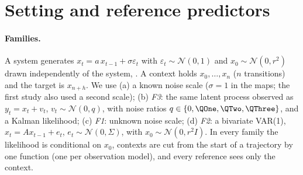 \section{Setting and reference predictors}
\paragraph{Families.} A system generates $x_t = a\,x_{t-1} + \sigma\varepsilon_t$ with $\varepsilon_t\sim\mathcal N(0,1)$ and
$x_0\sim\mathcal N(0,r^2)$ drawn independently of the system, \rlist. A context holds $x_0,\dots,x_n$ ($n$ transitions)
and the target is $x_{n+h}$. We use (a) a known noise scale ($\sigma=1$ in the maps; the first study also used a second
scale); (b) \emph{F3}: the same latent process observed as $y_t=x_t+v_t$, $v_t\sim\mathcal N(0,q)$, with noise ratios
$q\in\{0,\QOne,\QTwo,\QThree\}$, and a Kalman likelihood; (c) \emph{F1}: unknown noise scale; (d) \emph{F2}: a bivariate
VAR(1), $x_t=Ax_{t-1}+e_t$, $e_t\sim\mathcal N(0,\Sigma)$, with $x_0\sim\mathcal N(0,r^2 I)$. In every family the likelihood is
conditional on $x_0$, contexts are cut from the start of a trajectory by one function (one per observation model), and every
reference sees only the context.


